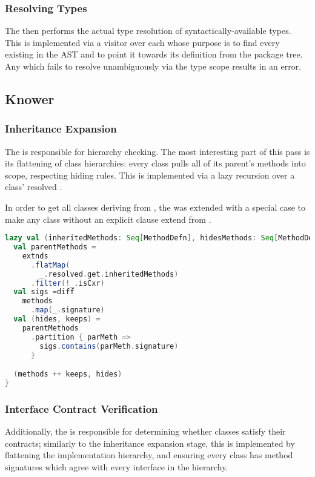 \documentclass{article}
\begin{document}
\subsubsection{Resolving Types}
The  then performs the actual type resolution of syntactically-available types. This is implemented via a
visitor over each  whose purpose is to find every  existing in the AST and to point it
towards its definition from the package tree. Any  which fails to resolve unambiguously via the type
scope results in an error.



\subsection{Knower}
\subsubsection{Inheritance Expansion}
The  is responsible for hierarchy checking. The most interesting part of this pass is its flattening of
class hierarchies: every class pulls all of its parent's methods into scope, respecting hiding rules. This is
implemented via a lazy recursion over a class' resolved .

In order to get all classes deriving from , the  was extended with a special case to
make any class without an explicit  clause extend from .

\begin{lstlisting}[language=Scala]
lazy val (inheritedMethods: Seq[MethodDefn], hidesMethods: Seq[MethodDefn]) = {
  val parentMethods =
    extnds
      .flatMap(
        _.resolved.get.inheritedMethods)
      .filter(!_.isCxr)
  val sigs =diff
    methods
      .map(_.signature)
  val (hides, keeps) =
    parentMethods
      .partition { parMeth =>
        sigs.contains(parMeth.signature)
      }

  (methods ++ keeps, hides)
}
\end{lstlisting}

\subsubsection{Interface Contract Verification}
Additionally, the  is responsible for determining whether classes satisfy their 
contracts; similarly to the inheritance expansion stage, this is implemented by flattening the implementation hierarchy,
and ensuring every class has method signatures which agree with every interface in the hierarchy.
\end{document}
